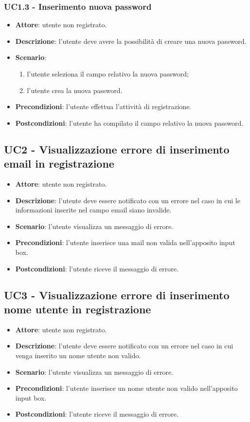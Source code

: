 \subsubsection{UC1.3 - Inserimento nuova password}
\begin{itemize}
    \item \textbf{Attore}: utente non registrato.
    \item \textbf{Descrizione}: l'utente deve avere la possibilità di creare una nuova password.
    \item \textbf{Scenario}:
    \begin{enumerate}
        \item l'utente seleziona il campo relativo la nuova password;
        \item l'utente crea la nuova password.
    \end{enumerate}

    \item \textbf{Precondizioni}: l'utente effettua l'attività di registrazione.
    \item \textbf{Postcondizioni}: l'utente ha compilato il campo relativo la nuova password.
\end{itemize}

\subsection{UC2 - Visualizzazione errore di inserimento email in registrazione}
\begin{itemize}
    \item \textbf{Attore}: utente non registrato.
    \item \textbf{Descrizione}: l'utente deve essere notificato con un errore nel caso in cui le informazioni inserite nel campo email siano invalide.
    \item \textbf{Scenario}: l'utente visualizza un messaggio di errore.
    \item \textbf{Precondizioni}: l'utente inserisce una mail non valida nell'apposito input box.
    \item \textbf{Postcondizioni}: l'utente riceve il messaggio di errore.
\end{itemize}

\subsection{UC3 - Visualizzazione errore di inserimento nome utente in registrazione}
\begin{itemize}
    \item \textbf{Attore}: utente non registrato.
    \item \textbf{Descrizione}: l'utente deve essere notificato con un errore nel caso in cui venga inserito un nome utente non valido.
    \item \textbf{Scenario}: l'utente visualizza un messaggio di errore.
    \item \textbf{Precondizioni}: l'utente inserisce un nome utente non valido nell'apposito input box.
    \item \textbf{Postcondizioni}: l'utente riceve il messaggio di errore.
\end{itemize}

